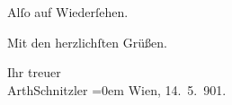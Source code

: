 \pstart
           Alſo auf Wiederſehen.\pend
           
\pstart
           Mit den herzlichſten Grüßen.\pend
           
\pstart
           Ihr treuer{\\[\baselineskip]}\spacefill\mbox{ArthSchnitzler}\pend
           \leftskip=0em{}
\pstart
           Wien, 14. 5. 901.\pend
           \endnumbering{}  \newcommand{\dateiname}{L01120}\newcommand{\titel}{Arthur Schnitzler an Georg Brandes, 14. 5. 1901}\newcommand{\editorInnen}{Martin Anton Müller und Gerd-Hermann Susen}
